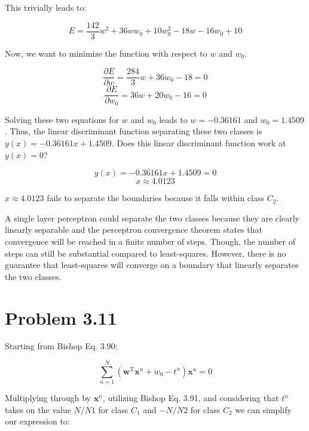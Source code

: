 \documentclass[12pt, letterpaper]{article}
\begin{document}
This trivially leads to:

\begin{equation}
E=\frac{142}{3} w^{2}+36 w w_{0}+10 w_{0}^{2}-18 w-16 w_{0}+10
\end{equation}

Now, we want to minimize the function with respect to $w$ and $w_0$. 

\begin{equation}
\frac{\partial E}{\partial w} = \frac{284}{3} w + 36 w_0 - 18 = 0
\end{equation}
\begin{equation}
\frac{\partial E}{\partial w_0} = 36 w + 20 w_0 - 16 = 0
\end{equation}

Solving these two equations for $w$ and $w_0$ leads to $w = -0.36161$ and $w_0 = 1.4509$. Thus, the linear discriminant function separating these two classes is $y(x) =  -0.36161 x + 1.4509$. Does this linear discriminant function work at $y(x) = 0$?

\begin{equation}
y(x) =  -0.36161 x + 1.4509 = 0
\end{equation}
\begin{equation}
x \approx 4.0123
\end{equation}

$x \approx 4.0123$ fails to separate the boundaries because it falls within class $C_2$. 

A single layer perceptron could separate the two classes because they are clearly linearly separable and the perceptron convergence theorem states that convergence will be reached in a finite number of steps. Though, the number of steps can still be substantial compared to least-squares. However, there is no guarantee that least-squares will converge on a boundary that linearly separates the two classes.

\section*{Problem 3.11}
Starting from Bishop Eq. 3.90:

\begin{equation}
\sum_{n=1}^{N}\left(\mathbf{w}^{\mathrm{T}} \mathbf{x}^{n}+w_{0}-t^{n}\right) \mathbf{x}^{n}=0
\end{equation}

Multiplying through by $\mathbf{x}^n$, utilizing Bishop Eq. 3.91, and considering that $t^n$ takes on the value $N/N1$ for class $C_1$ and $-N/N2$ for class $C_2$ we can simplify our expression to:
\end{document}

